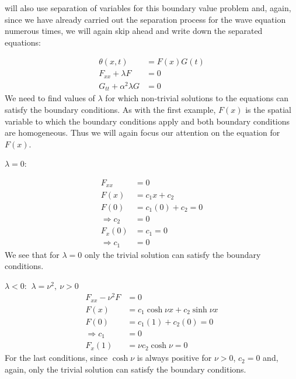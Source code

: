  will also use separation of variables for this boundary value problem and, again, since we have already carried out the separation process for the wave equation numerous times, we will again skip ahead and write down the separated equations:

\begin{align*}
\theta(x,t) &= F(x)G(t) \\
F_{xx} + \lambda F &= 0 \\
G_{tt} + \alpha^2 \lambda G &= 0
\end{align*}
We need to find values of $\lambda$ for which non-trivial solutions to the equations can satisfy the boundary conditions.  As with the first example, $F(x)$ is the spatial variable to which the boundary conditions apply and both boundary conditions are homogeneous.  Thus we will again focus our attention on the equation for $F(x)$.

\vspace{0.25cm}

\noindent\underline{$\lambda = 0$}:

\begin{align*}
F_{xx} &= 0 \\
F(x) &= c_1x + c_2 \\
F(0) &= c_1(0) + c_2 = 0 \\
\Rightarrow c_2 &= 0 \\
F_{x}(0) &= c_1 = 0 \\
\Rightarrow c_1 &= 0
\end{align*}
We see that for $\lambda = 0$ only the trivial solution can satisfy the boundary conditions.

\vspace{0.25cm}

\noindent\underline{$\lambda < 0$}: $\ \lambda = \nu^2, \ \nu>0$
\begin{align*}
F_{xx} - \nu^2 F &= 0 \\
F(x) &= c_1 \cosh{\nu x} + c_2 \sinh{\nu x} \\
F(0) &= c_1(1) + c_2(0) = 0 \\
\Rightarrow c_1 &= 0 \\
F_{x}(1) &= \nu c_2 \cosh{\nu} = 0
\end{align*} 
For the last conditions, since $\cosh{\nu}$ is always positive for $\nu>0$, $c_2 = 0$ and, again, only the trivial solution can satisfy the boundary conditions.

